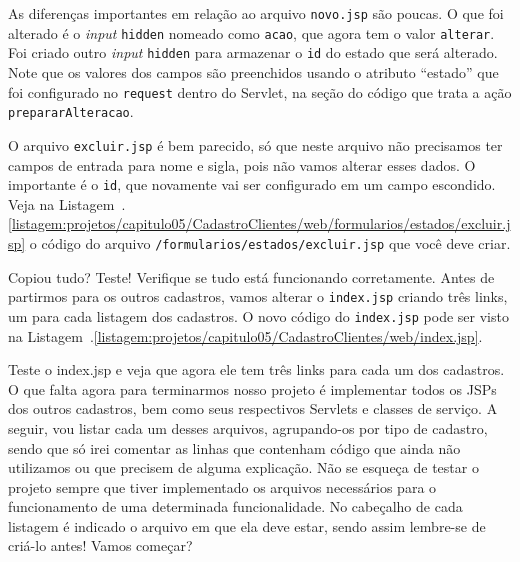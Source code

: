 As diferenças importantes em relação ao arquivo \texttt{novo.jsp} são poucas. O que foi alterado é o \textit{input} \texttt{hidden} nomeado como \texttt{acao}, que agora tem o valor \texttt{alterar}. Foi criado outro \textit{input} \texttt{hidden} para armazenar o \texttt{id} do estado que será alterado. Note que os valores dos campos são preenchidos usando o atributo ``estado'' que foi configurado no \texttt{request} dentro do Servlet, na seção do código que trata a ação \texttt{prepararAlteracao}.

O arquivo \texttt{excluir.jsp} é bem parecido, só que neste arquivo não precisamos ter campos de entrada para nome e sigla, pois não vamos alterar esses dados. O importante é o \texttt{id}, que novamente vai ser configurado em um campo escondido. Veja na Listagem~\thechapter.\ref{listagem:projetos/capitulo05/CadastroClientes/web/formularios/estados/excluir.jsp} o código do arquivo \texttt{/formularios/estados/excluir.jsp} que você deve criar.


Copiou tudo? Teste! Verifique se tudo está funcionando corretamente. Antes de partirmos para os outros cadastros, vamos alterar o \texttt{index.jsp} criando três links, um para cada listagem dos cadastros. O novo código do \texttt{index.jsp} pode ser visto na Listagem~\thechapter.\ref{listagem:projetos/capitulo05/CadastroClientes/web/index.jsp}.


Teste o index.jsp e veja que agora ele tem três links para cada um dos cadastros. O que falta agora para terminarmos nosso projeto é implementar todos os JSPs dos outros cadastros, bem como seus respectivos Servlets e classes de serviço. A seguir, vou listar cada um desses arquivos, agrupando-os por tipo de cadastro, sendo que só irei comentar as linhas que contenham código que ainda não utilizamos ou que precisem de alguma explicação. Não se esqueça de testar o projeto sempre que tiver implementado os arquivos necessários para o funcionamento de uma determinada funcionalidade. No cabeçalho de cada listagem é indicado o arquivo em que ela deve estar, sendo assim lembre-se de criá-lo antes! Vamos começar?

